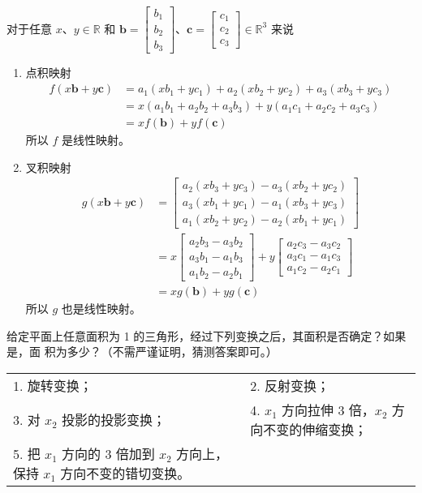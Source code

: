 	\begin{solution}
		对于任意 $x$、$y\in\mathbb{R}$ 和 $\boldsymbol{b}=\begin{bmatrix}
			b_1\\b_2\\b_3
		\end{bmatrix}$、$\boldsymbol{c}=\begin{bmatrix}
			c_1\\c_2\\c_3
		\end{bmatrix}\in\mathbb{R}^3$ 来说
		\begin{enumerate}
			\item 点积映射
			\begin{align*}
				f(x\boldsymbol{b}+y\boldsymbol{c})&=a_1(xb_1+yc_1)+a_2(xb_2+yc_2)+a_3(xb_3+yc_3)\\
				&=x(a_1b_1+a_2b_2+a_3b_3)+y(a_1c_1+a_2c_2+a_3c_3)\\
				&=xf(\boldsymbol{b})+yf(\boldsymbol{c})
			\end{align*}
			所以 $f$ 是线性映射。
			\item 叉积映射
			\begin{align*}
				g(x\boldsymbol{b}+y\boldsymbol{c})&=\begin{bmatrix}
					a_2(xb_3+yc_3)-a_3(xb_2+yc_2)\\
					a_3(xb_1+yc_1)-a_1(xb_3+yc_3)\\
					a_1(xb_2+yc_2)-a_2(xb_1+yc_1)
				\end{bmatrix}\\
				&=x\begin{bmatrix}
					a_2b_3-a_3b_2\\
					a_3b_1-a_1b_3\\
					a_1b_2-a_2b_1
				\end{bmatrix}+y\begin{bmatrix}
				a_2c_3-a_3c_2\\
				a_3c_1-a_1c_3\\
				a_1c_2-a_2c_1
				\end{bmatrix}\\
				&=xg(\boldsymbol{b})+yg(\boldsymbol{c})
			\end{align*}
			所以 $g$ 也是线性映射。
		\end{enumerate}
	\end{solution}
	 \newpage
	\begin{exercise}[1.1.11]
		给定平面上任意面积为 1 的三角形，经过下列变换之后，其面积是否确定？如果是，面
		积为多少？（不需严谨证明，猜测答案即可。）
		\begin{table}[htbp]
			\centering
			\begin{tabular}{p{0.45\textwidth}p{}}
				1. 旋转变换；&2. 反射变换；\\
				3. 对 $x_2$ 投影的投影变换；&4. $x_1$ 方向拉伸 3 倍，$x_2$ 方向不变的伸缩变换；\\
				5. 把 $x_1$ 方向的 3 倍加到 $x_2$ 方向上，保持 $x_1$ 方向不变的错切变换。
			\end{tabular}
		\end{table}
	\end{exercise}
